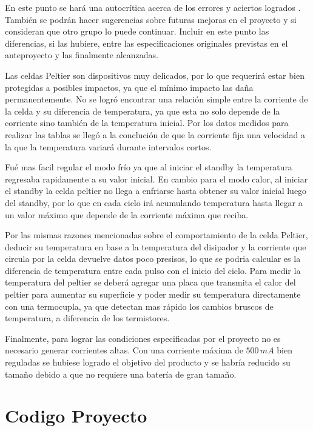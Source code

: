 \documentclass[10pt,spanish,a4paper,openany,notitlepage]{article}
\begin{document}
En este punto se hará una autocrítica acerca de los errores y aciertos 
logrados . También se podrán  hacer sugerencias sobre futuras mejoras 
en el proyecto y si consideran que otro grupo lo puede continuar. Incluir 
en este punto las diferencias, si las hubiere, entre las especificaciones 
originales previstas en el anteproyecto y las finalmente alcanzadas.


Las celdas Peltier son dispositivos muy delicados, por lo que requerirá
estar bien protegidas a posibles impactos, ya que el mínimo impacto
las daña permanentemente. 
No se logró encontrar una relación simple entre la corriente de la celda
y su diferencia de temperatura, ya que esta no solo depende de la corriente
sino también de la temperatura inicial. Por los datos medidos para realizar
las tablas se llegó a la conclución de que la corriente fija una velocidad
a la que la temperatura variará durante intervalos cortos.

Fué mas facil regular el modo frío ya que al iniciar el standby la
temperatura regresaba rapidamente a su valor inicial. En cambio para el
modo calor, al iniciar el standby la celda peltier no llega a enfriarse
hasta obtener su valor inicial luego del standby, por lo que en cada ciclo
irá acumulando temperatura hasta llegar a un valor máximo que depende
de la corriente máxima que reciba.

Por las mismas razones mencionadas sobre el comportamiento de la celda Peltier,
deducir su temperatura en base a la temperatura del disipador y la corriente
que circula por la celda devuelve datos poco presisos, lo que se podria calcular
es la diferencia de temperatura entre cada pulso con el inicio del ciclo.
Para medir la temperatura del peltier se deberá agregar una placa que
transmita el calor del peltier para aumentar su superficie y poder medir su
temperatura directamente con una termocupla, ya que detectan mas rápido
los cambios bruscos de temperatura, a diferencia de los termistores. 


Finalmente, para lograr las condiciones especificadas por el proyecto
no es necesario generar corrientes altas. Con una corriente máxima de
$500\, \unit{mA}$ bien reguladas se hubiese logrado el objetivo del producto
y se habría reducido su tamaño debido a que no requiere una batería de
gran tamaño.

\appendix 

\newpage
\section{Codigo Proyecto}
\end{document}
